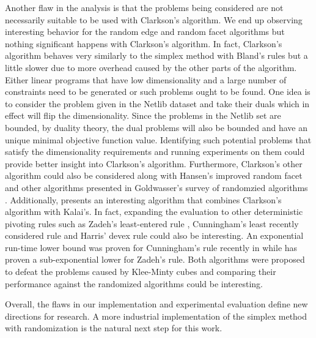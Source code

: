 \documentclass{standalone}
\begin{document}
  Another flaw in the analysis is that the problems being considered are not necessarily suitable to be used with Clarkson's algorithm. We end up observing interesting behavior for the random edge and random facet algorithms but nothing significant happens with Clarkson's algorithm. In fact, Clarkson's algorithm behaves very similarly to the simplex method with Bland's rules but a little slower due to more overhead caused by the other parts of the algorithm. Either linear programs that have low dimensionality and a large number of constraints need to be generated or such problems ought to be found. One idea is to consider the problem given in the Netlib dataset and take their duals which in effect will flip the dimensionality. Since the problems in the Netlib set are bounded, by duality theory, the dual problems will also be bounded and have an unique minimal objective function value. Identifying such potential problems that satisfy the dimensionality requirements and running experiments on them could provide better insight into Clarkson's algorithm. Furthermore, Clarkson's other algorithm could also be considered along with Hansen's improved random facet \cite{hansen2015improved} and other algorithms presented in Goldwasser's survey of randomzied algorithms \cite{goldwasser1995survey}. Additionally, \cite{gartner1996linear} presents an interesting algorithm that combines Clarkson's algorithm with Kalai's. In fact, expanding the evaluation to other deterministic pivoting rules such as Zadeh's least-entered rule \cite{zadeh2009worst}, Cunningham's least recently considered rule \cite{cunningham1979theoretical} and Harris' devex rule \cite{harris1973pivot} could also be interesting. An exponential run-time lower bound was proven for Cunningham's rule recently in \cite{avis2017exponential} while \cite{friedmann2011subexponential} has proven a sub-exponential lower for Zadeh's rule. Both algorithms were proposed to defeat the problems caused by Klee-Minty cubes and comparing their performance against the randomized algorithms could be interesting.\par
  Overall, the flaws in our implementation and experimental evaluation define new directions for research. A more industrial implementation of the simplex method with randomization is the natural next step for this work.
\end{document}

